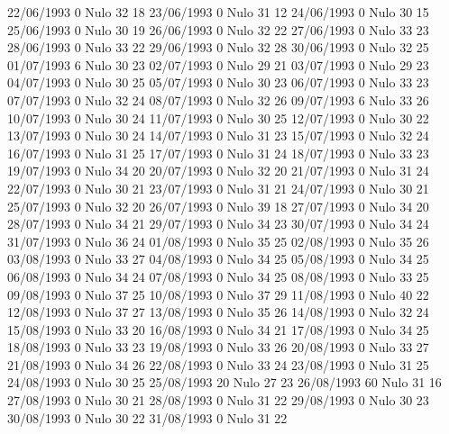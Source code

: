 22/06/1993  0     Nulo    32     18 
23/06/1993  0     Nulo    31     12 
24/06/1993  0     Nulo    30     15 
25/06/1993  0     Nulo    30     19 
26/06/1993  0     Nulo    32     22 
27/06/1993  0     Nulo    33     23 
28/06/1993  0     Nulo    33     22 
29/06/1993  0     Nulo    32     28 
30/06/1993  0     Nulo    32     25 
01/07/1993  6     Nulo    30     23 
02/07/1993  0     Nulo    29     21 
03/07/1993  0     Nulo    29     23 
04/07/1993  0     Nulo    30     25 
05/07/1993  0     Nulo    30     23 
06/07/1993  0     Nulo    33     23 
07/07/1993  0     Nulo    32     24 
08/07/1993  0     Nulo    32     26 
09/07/1993  6     Nulo    33     26 
10/07/1993  0     Nulo    30     24 
11/07/1993  0     Nulo    30     25 
12/07/1993  0     Nulo    30     22 
13/07/1993  0     Nulo    30     24 
14/07/1993  0     Nulo    31     23 
15/07/1993  0     Nulo    32     24 
16/07/1993  0     Nulo    31     25 
17/07/1993  0     Nulo    31     24 
18/07/1993  0     Nulo    33     23 
19/07/1993  0     Nulo    34     20 
20/07/1993  0     Nulo    32     20 
21/07/1993  0     Nulo    31     24 
22/07/1993  0     Nulo    30     21 
23/07/1993  0     Nulo    31     21 
24/07/1993  0     Nulo    30     21 
25/07/1993  0     Nulo    32     20 
26/07/1993  0     Nulo    39     18 
27/07/1993  0     Nulo    34     20 
28/07/1993  0     Nulo    34     21 
29/07/1993  0     Nulo    34     23 
30/07/1993  0     Nulo    34     24 
31/07/1993  0     Nulo    36     24 
01/08/1993  0     Nulo    35     25 
02/08/1993  0     Nulo    35     26 
03/08/1993  0     Nulo    33     27 
04/08/1993  0     Nulo    34     25 
05/08/1993  0     Nulo    34     25 
06/08/1993  0     Nulo    34     24 
07/08/1993  0     Nulo    34     25 
08/08/1993  0     Nulo    33     25 
09/08/1993  0     Nulo    37     25 
10/08/1993  0     Nulo    37     29 
11/08/1993  0     Nulo    40     22 
12/08/1993  0     Nulo    37     27 
13/08/1993  0     Nulo    35     26 
14/08/1993  0     Nulo    32     24 
15/08/1993  0     Nulo    33     20 
16/08/1993  0     Nulo    34     21 
17/08/1993  0     Nulo    34     25 
18/08/1993  0     Nulo    33     23 
19/08/1993  0     Nulo    33     26 
20/08/1993  0     Nulo    33     27 
21/08/1993  0     Nulo    34     26 
22/08/1993  0     Nulo    33     24 
23/08/1993  0     Nulo    31     25 
24/08/1993  0     Nulo    30     25 
25/08/1993  20    Nulo    27     23 
26/08/1993  60    Nulo    31     16 
27/08/1993  0     Nulo    30     21 
28/08/1993  0     Nulo    31     22 
29/08/1993  0     Nulo    30     23 
30/08/1993  0     Nulo    30     22 
31/08/1993  0     Nulo    31     22 
